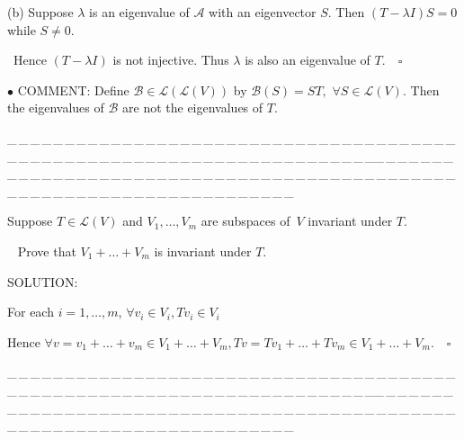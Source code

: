\documentclass[a4paper, 11pt, UTF8]{article}
\def\Lm{\mathcal{L}}
\begin{document}
\begin{large}
(b) Suppose $\lambda$ is an eigenvalue of $\mathcal{A}$ with an eigenvector $S.$ Then $(T-\lambda I)S=0$ while $S\neq 0.$\par\qquad\,
Hence $(T-\lambda I)$ is not injective. Thus $\lambda$ is also an eigenvalue of $T.\quad\square$\par
{\small $\bullet$} C{\small OMMENT:} {\normalsize Define $\mathcal{B}\in\Lm(\Lm(V))$ by $\mathcal{B}(S)=ST,$ $\forall S\in\Lm(V).$
Then the eigenvalues of $\mathcal{B}$ are not the eigenvalues of $T.$}\par
{\tiny \_\,\_\,\_\,\_\,\_\,\_\,\_\,\_\,\_\,\_\,\_\,\_\,\_\,\_\,\_\,\_\,\_\,\_\,\_\,\_\,\_\,\_\,\_\,\_\,\_\,\_\,\_\,\_\,\_\,\_\,\_\,\_\,\_\,\_\,\_\,\_\,\_\,\_\,\_\,\_\,\_\,\_\,\_\,\_\,\_\,\_\,\_\,\_\,\_\,\_\,\_\,\_\,\_\,\_\,\_\,\_\,\_\,\_\,\_\,\_\,\_\,\_\,\_\,\_\,\_\,\_\,\_\,\_\,\_\,\_\,\_\_\,\_\,\_\,\_\,\_\,\_\,\_\,\_\,\_\,\_\,\_\,\_\,\_\,\_\,\_\,\_\,\_\,\_\,\_\,\_\,\_\,\_\,\_\,\_\,\_\,\_\,\_\,\_\,\_\,\_\,\_\,\_\,\_\,\_\,\_\,\_\,\_\,\_\,\_\,\_\,\_\,\_\,\_\,\_\,\_\,\_\,\_\,\_\,\_\,\_\,\_\,\_\,\_\,\_\,\_\,\_\,\_\,\_\,\_\,\_\,\_\,\_\,\_\,\_\,\_\,\_\,\_\,\_\,\_\,\_\,\_}\par

{\Large{}} {\timessl\Large 
Suppose $T\in\Lm(V)$ and $V_1,\dots,V_m$ are subspaces of \,$V$ invariant under $T$.}\par\,\,\,
{\timessl\Large Prove that $V_1+\dots+V_m$ is invariant under $T$.
}\par
{\timesbf S\footnotesize{OLUTION:}}\par\quad
For each $i=1,\dots,m$, $\forall v_i\in V_i,Tv_i\in V_i$\par\quad
Hence $\forall v=v_1+\dots+v_m\in V_1+\dots+V_m,Tv=Tv_1+\dots+Tv_m\in V_1+\dots+V_m.\quad\square$\par
{\tiny \_\,\_\,\_\,\_\,\_\,\_\,\_\,\_\,\_\,\_\,\_\,\_\,\_\,\_\,\_\,\_\,\_\,\_\,\_\,\_\,\_\,\_\,\_\,\_\,\_\,\_\,\_\,\_\,\_\,\_\,\_\,\_\,\_\,\_\,\_\,\_\,\_\,\_\,\_\,\_\,\_\,\_\,\_\,\_\,\_\,\_\,\_\,\_\,\_\,\_\,\_\,\_\,\_\,\_\,\_\,\_\,\_\,\_\,\_\,\_\,\_\,\_\,\_\,\_\,\_\,\_\,\_\,\_\,\_\,\_\,\_\_\,\_\,\_\,\_\,\_\,\_\,\_\,\_\,\_\,\_\,\_\,\_\,\_\,\_\,\_\,\_\,\_\,\_\,\_\,\_\,\_\,\_\,\_\,\_\,\_\,\_\,\_\,\_\,\_\,\_\,\_\,\_\,\_\,\_\,\_\,\_\,\_\,\_\,\_\,\_\,\_\,\_\,\_\,\_\,\_\,\_\,\_\,\_\,\_\,\_\,\_\,\_\,\_\,\_\,\_\,\_\,\_\,\_\,\_\,\_\,\_\,\_\,\_\,\_\,\_\,\_\,\_\,\_\,\_\,\_\,\_\par}


\end{large}
\end{document}
